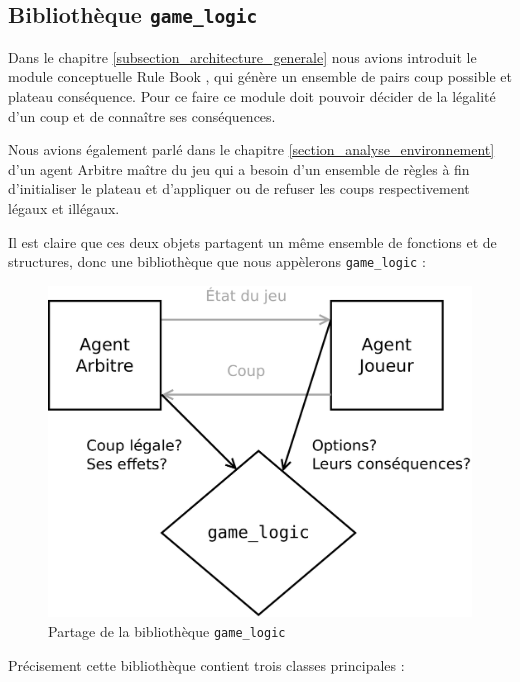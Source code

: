 \subsection{Bibliothèque \texttt{\gls{game_logic}}}

Dans le chapitre \ref{subsection_architecture_generale} nous avions introduit le module conceptuelle \og Rule Book \fg{}, qui génère un ensemble de pairs coup possible et plateau conséquence. Pour ce faire ce module doit pouvoir décider de la légalité d'un coup et de connaître ses conséquences. 

Nous avions également parlé dans le chapitre \ref{section_analyse_environnement} d'un agent \og Arbitre \fg{} maître du jeu qui a besoin d'un ensemble de règles à fin d'initialiser le plateau et d'appliquer ou de refuser les coups respectivement légaux et illégaux.

Il est claire que ces deux objets partagent un même ensemble de fonctions et de structures, donc une bibliothèque que nous appèlerons \texttt{game\_logic}  :

\begin{figure}[H] 
\centering
\includegraphics[width=\textwidth]{files/env/game_logic_shared} 
\caption{Partage de la bibliothèque \texttt{game\_logic}} 
\label{game_logic_shared}
\end{figure}

Précisement cette bibliothèque contient trois classes principales :

